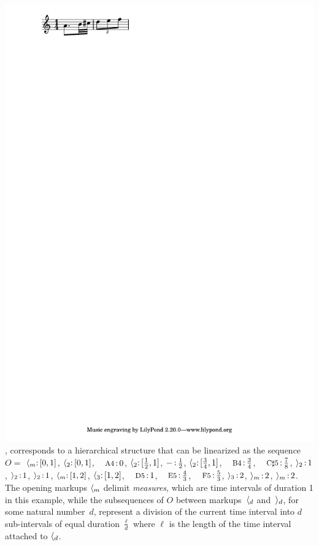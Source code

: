 \begin{example}
\includegraphics[scale=0.35,trim=0 5mm 0 0]{pictures/ex1.pdf},
corresponds to a hierarchical structure
that can be linearized as the sequence
$O =$
$\ccall{\mathsf{m}}\ts{[0,1]}$,
$\langle_{2}\mathop{:}{[0,1]}$,
$\mbox{\footnotesize A4}\ts{0}$,
$\langle_{2}\mathop{:}{[\frac{1}{2},1]}$,
$-\mathop{:}{\frac{1}{2}}$,
$\langle_{2}\mathop{:}{[\frac{3}{4},1]}$,
$\mbox{\footnotesize B4}\ts{\frac{3}{4}}$,
$\mbox{\footnotesize C$\sharp$5}\ts{\frac{7}{8}}$,
$\rangle_{2}\mathop{:}{1}$,
$\rangle_{2}\mathop{:}{1}$,
$\rangle_{2}\mathop{:}{1}$,
$\ccall{\mathsf{m}}\ts{[1,2]}$,
$\langle_{3}\mathop{:}{[1,2]}$,
$\mbox{\footnotesize D5}\ts{1}$,
$\mbox{\footnotesize E5}\ts{\frac{4}{3}}$,
$\mbox{\footnotesize F5}\ts{\frac{5}{3}}$,
$\rangle_{3}\mathop{:}{2}$,
$\creturn{\mathsf{m}}\ts{2}$,
$\creturn{\mathsf{m}}\ts{2}$.
The opening markups $\ccall{\mathsf{m}}$ %
delimit \emph{measures},
which are time intervals of duration 1 in this example,
while the subsequences of $O$ between markups~$\langle_{d}$ and~$\rangle_{d}$,
for some natural number~$d$,
represent a division of the current
time interval into $d$ sub-intervals of equal duration
$\frac{\ell}{d}$ where $\ell$ is the length of the time interval attached to $\langle_{d}$.


\end{example}
